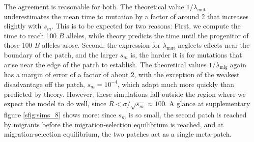 \documentclass{article}
\newcommand{\migrate}{\lambda_\text{mig}}
\newcommand{\mutrate}{\lambda_\text{mut}}
\begin{document}
The agreement is reasonable for both.
The theoretical value $1/\mutrate$ underestimates the mean time to mutation
by a factor of around 2 that increases slightly with $s_m$.
This is to be expected for two reasons:
First, we compute the time to reach 100 $B$ alleles, while theory predicts
the time until the progenitor of those 100 $B$ alleles arose.
Second, the expression for $\mutrate$ neglects effects near the boundary of the patch,
and the larger $s_m$ is, 
the harder it is for mutations that arise near the edge of the patch to establish.
The theoretical values $1/\migrate$ again has a margin of error of a factor of about 2,
with the exception of the weakest disadvantage off the patch, $s_m=10^{-4}$,
which adapt much more quickly than predicted by theory.
However, these simulations fall outside the region where we expect the model to do well,
since $R < \sigma/\sqrt{s_m} \approx 100$.
A glance at supplementary figure \ref{sfig:sims_8} shows more:
since $s_m$ is so small, the second patch is reached by migrants before the migration-selection equilibrium is reached,
and at migration-selection equilibrium, the two patches act as a single meta-patch.
\end{document}
